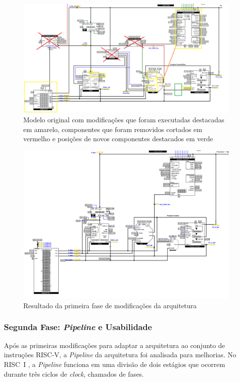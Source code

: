 \documentclass[
	12pt,				%
	openright,			%
	oneside,			%
	a4paper,			%
	english,			%
	french,				%
	spanish,			%
	brazil,				%
	]{abntex2}
\begin{document}
\begin{figure}[H]
    \centering
    \includegraphics[width=0.9\linewidth]{ProcessoDesenvolvimento/Arquitetura/arquitetura1.png}
    \caption{Modelo original com modificações que foram executadas destacadas em amarelo, componentes que foram removidos cortados em vermelho e posições de novos componentes destacados em verde}
    \label{fig:desenvolvimento_arquitetura1}
\end{figure}
\begin{figure}[H]
    \centering
    \includegraphics[width=0.9\linewidth]{ProcessoDesenvolvimento/Arquitetura/Arquitetura2.png}
    \caption{Resultado da primeira fase de modificações da arquitetura}
    \label{fig:desenvolvimento_arquitetura2}
\end{figure}


\subsubsection{Segunda Fase: \textit{Pipeline} e Usabilidade}

Após as primeiras modificações para adaptar a arquitetura ao conjunto de instruções RISC-V, a \textit{Pipeline} da arquitetura foi analisada para melhorias. No RISC~I \cite{peek_vlsi_1983}, a \textit{Pipeline} funciona em uma divisão de dois estágios que ocorrem durante três ciclos de \textit{clock}, chamados de fases.
\end{document}
